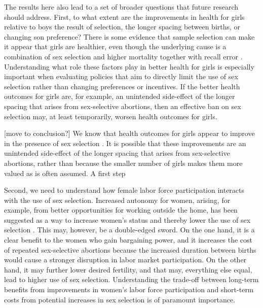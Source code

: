 \documentclass[12pt,letterpaper]{article}
\begin{document}
The results here also lead to a set of broader questions that
future research should address.
First, to what extent are the improvements in health for girls
relative to boys the result of selection, the longer spacing between
births, or changing son preference?
There is some evidence that sample selection can make it appear that girls are healthier, 
even though the underlying cause is a combination of sex selection and higher mortality 
together with recall error \citep{Portner2018a}. 
Understanding what role these factors play in better health for
girls is especially important when evaluating policies that 
aim to directly limit the use of sex selection rather than 
changing preferences or incentives.
If the better health outcomes for girls are, for example, an unintended 
side-effect of the longer spacing that arises from sex-selective 
abortions, then an effective ban on sex selection may, at least
temporarily, worsen health outcomes for girls.


[move to conclusion?]
We know that health outcomes for girls appear to improve in the presence of sex 
selection \citep{Lin2014,Hu2015}.
It is possible that these improvements are an unintended side-effect of the longer spacing 
that arises from sex-selective abortions, rather than because the smaller number of girls 
makes them more valued as is often assumed.
A first step 



Second, we need to understand how female labor force participation
interacts with the use of sex selection.
Increased autonomy for women, arising, for example, from better opportunities
for working outside the home, has been suggested as a way to increase
women's status and thereby lower the use of sex selection \citep{Das-Gupta2016}.
This may, however, be a double-edged sword.
On the one hand, it is a clear benefit to the women who gain  
bargaining power, and it increases the cost of repeated 
sex-selective abortions because the increased duration between births
would cause a stronger disruption in labor market participation.
On the other hand, it may further lower desired fertility, and 
that may, everything else equal, lead to higher use of sex selection.
Understanding the trade-off between long-term benefits from improvements in
women's labor force participation and short-term costs from potential 
increases in sex selection is of paramount importance.


\clearpage

\onehalfspacing


\end{document}
